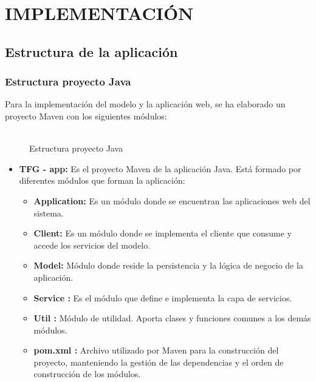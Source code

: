 \chapter[Implementación]{
  \label{chp:implementacion}
  IMPLEMENTACIÓN
}
\thispagestyle{numberingStyle}
\pagestyle{numberingStyle}



\section{Estructura de la aplicación}
\subsection{Estructura proyecto Java}
Para la implementación del modelo y la aplicación web, se ha elaborado un proyecto Maven con los siguientes módulos:
\\
\\

\begin{figure}[H]
\centering
{}
\caption{Estructura proyecto Java}
\end{figure}


\begin{itemize}
	\item \textbf{TFG - app: } Es el proyecto Maven de la aplicación Java. Está formado por diferentes módulos que forman la aplicación:
	\begin{itemize}
		\item \textbf{Application: } Es un módulo donde se encuentran las aplicaciones web del sistema.
		\item \textbf{Client: } Es un módulo donde se implementa el cliente que consume y accede los servicios del modelo.
		\item \textbf{Model: } Módulo donde reside la persistencia y la lógica de negocio de la aplicación.
		\item \textbf{Service : } Es el módulo que define e implementa la capa de servicios.
		\item \textbf{Util : } Módulo de utilidad. Aporta clases y funciones comunes a los demás módulos.
		\item \textbf{pom.xml : } Archivo utilizado por Maven para la construcción del proyecto, manteniendo la gestión de las dependencias y el orden de construcción de los módulos.
	\end{itemize}
\end{itemize}

